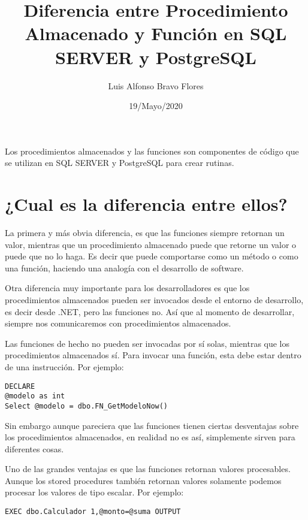 \documentclass[10pt]{article}
\title{Diferencia entre Procedimiento Almacenado y Función en SQL SERVER y PostgreSQL}
\author{Luis Alfonso Bravo Flores} %
\date{19/Mayo/2020}
\begin{document}
\maketitle

Los procedimientos almacenados y las funciones son componentes de código que se utilizan en SQL SERVER y PostgreSQL para crear rutinas.

\section*{¿Cual es la diferencia entre ellos?}

La primera y más obvia diferencia, es que las funciones siempre retornan un valor, mientras que un procedimiento almacenado puede que retorne un valor o puede que no lo haga. Es decir que puede comportarse como un método o como una función, haciendo una analogía con el desarrollo de software.

Otra diferencia muy importante para los desarrolladores es que los procedimientos almacenados pueden ser invocados desde el entorno de desarrollo, es decir desde .NET, pero las funciones no.  Así que al momento de desarrollar, siempre nos comunicaremos con procedimientos almacenados.

Las funciones de hecho no pueden ser invocadas por sí solas, mientras que los procedimientos almacenados sí. Para invocar una función, esta debe estar dentro de una instrucción. Por ejemplo: \\

\begin{verbatim}
DECLARE 
@modelo as int
Select @modelo = dbo.FN_GetModeloNow()
\end{verbatim}

Sin embargo aunque pareciera que las funciones tienen ciertas desventajas sobre los procedimientos almacenados, en realidad no es así, simplemente sirven para diferentes cosas.

Uno de las grandes ventajas es que las funciones retornan valores procesables. Aunque los stored procedures también retornan valores solamente podemos procesar los valores de tipo escalar. Por ejemplo:


\begin{verbatim}
EXEC dbo.Calculador 1,@monto=@suma OUTPUT
\end{verbatim}
\end{document}
